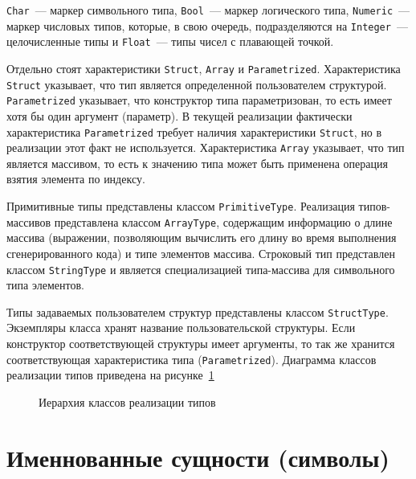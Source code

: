 \documentclass[times,specification,annotation]{style/itmo-student-thesis/itmo-student-thesis}
\begin{document}
\texttt{Char}~--- маркер символьного типа, \texttt{Bool}~--- маркер логического типа, \texttt{Numeric}~--- маркер числовых типов, которые, в свою очередь, подразделяются на \texttt{Integer}~--- целочисленные типы и \texttt{Float}~--- типы чисел с плавающей точкой. 

Отдельно стоят характеристики \texttt{Struct}, \texttt{Array} и \texttt{Parametrized}. Характеристика \texttt{Struct} указывает, что тип является определенной пользователем структурой. \texttt{Parametrized} указывает, что конструктор типа параметризован, то есть имеет хотя бы один аргумент (параметр). В текущей реализации фактически характеристика \texttt{Parametrized} требует наличия характеристики \texttt{Struct}, но в реализации этот факт не используется. Характеристика \texttt{Array} указывает, что тип является массивом, то есть к значению типа может быть применена операция взятия элемента по индексу.

Примитивные типы представлены классом \texttt{PrimitiveType}. Реализация типов-массивов представлена классом \texttt{ArrayType}, содержащим информацию о длине массива (выражении, позволяющим вычислить его длину во время выполнения сгенерированного кода) и типе элементов массива. Строковый тип представлен классом \texttt{StringType} и является специализацией типа-массива для символьного типа элементов.

Типы задаваемых пользователем структур представлены классом \texttt{StructType}. Экземпляры класса хранят название пользовательской структуры. Если конструктор соответствующей структуры имеет аргументы, то так же хранится соответствующая характеристика типа (\texttt{Parametrized}). Диаграмма классов реализации типов приведена на рисунке~\ref{type-classes-hierarchy}

\begin{figure}[!h]
\caption{Иерархия классов реализации типов}\label{type-classes-hierarchy}
\centering
{}
\end{figure}

\section{Именнованные сущности (символы)}
\end{document}
